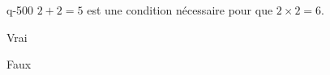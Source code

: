 \begin{truefalse}{q-500}
$2+2=5$ est une condition nécessaire pour que $2\times 2=6$.
\item* Vrai
\item Faux
\end{truefalse}

